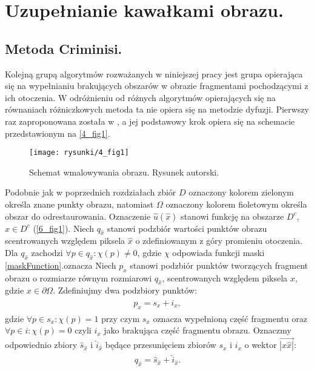 \documentclass[12pt, twoside, openany]{report}
\theoremstyle{definition}
\begin{document}
\chapter{Uzupełnianie kawałkami obrazu.}
\section{Metoda Criminisi.}
\label{sec:crimMetod}
Kolejną grupą algorytmów rozważanych w niniejszej pracy jest grupa opierająca się na wypełnianiu brakujących obszarów w obrazie fragmentami pochodzącymi z ich otoczenia. W odróżnieniu od różnych algorytmów opierających się na równaniach różniczkowych metoda ta nie opiera się na metodzie dyfuzji. Pierwszy raz zaproponowana została w \cite{efros1999texture}, a jej podstawowy krok opiera się na schemacie przedstawionym na \autoref{4_fig1}.
\begin{figure}[!h]
	\centering
	\texttt{[image: rysunki/4\_fig1]}
	\caption{Schemat wmalowywania obrazu. Rysunek autorski.}
	\label{4_fig1}
\end{figure}
Podobnie jak w poprzednich rozdziałach zbiór $D$ oznaczony kolorem zielonym
określa znane punkty obrazu, natomiast $\Omega$ oznaczony kolorem fioletowym określa obszar do odrestaurowania.
Oznaczenie $\hat{u}(\hat{x})$ stanowi funkcję na obszarze $D^c$, $\hat{x}  \in D^c$ (\autoref{6_fig1}).
Niech $q_{\hat{x}}$ stanowi podzbiór wartości punktów obrazu scentrowanych względem piksela $\hat{x}$ o zdefiniowanym z góry promieniu otoczenia.
Dla $q_{\hat{x}}$ zachodzi $\forall p \in q_{\hat{x}} : \chi(p) \neq 0$, gdzie $\chi$ odpowiada funkcji maski \eqref{maskFunction}.oznacza 
Niech $p_{x}$ stanowi podzbiór punktów tworzących fragment obrazu o rozmiarze równym rozmiarowi $q_{\hat{x}}$, scentrowanych względem piksela $x$, gdzie $x \in \partial \Omega$.
Zdefiniujmy dwa podzbiory punktów:
\begin{align}
\begin{aligned}
p_{x} = s_x + i_x,
\end{aligned}
\end{align}
gdzie $\forall p \in s_x : \chi(p) = 1$ przy czym $s_x$ oznacza wypełnioną część fragmentu oraz $\forall p \in i : \chi(p) = 0$ czyli $i_x$ jako brakująca część fragmentu obrazu.  
Oznaczmy odpowiednio zbiory $\hat{s}_{\hat{x}}$ i $\hat{i}_{\hat{x}}$ będące przesunięciem zbiorów $s_x$ i $i_x$ o wektor $\overrightarrow{|x \hat{x}|}$:
\begin{align}
\begin{aligned}
q_{\hat{x}} = \hat{s}_{\hat{x}} + \hat{i}_{\hat{x}}.
\end{aligned}
\end{align}
\end{document}
